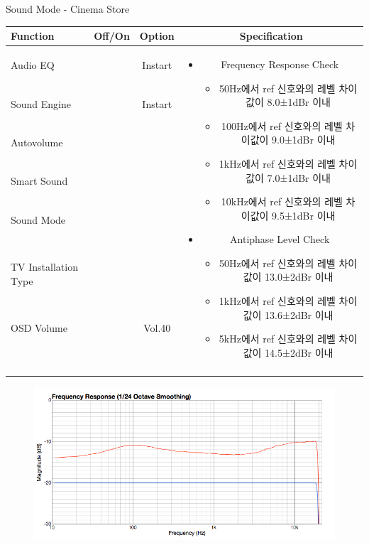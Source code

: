 \begin{frame}[t]{Sound Mode - Cinema Store}
\begin{tiny}
\begin{tabular}{@{}lccc@{}}
\toprule
Function & Off/On & Option & Specification \\
\midrule
Audio EQ & \color{black}{Off} & Instart &
\multirow{10}{60mm}{
\begin{itemize}
\item Frequency Response Check
	\begin{itemize}
	\item 50Hz에서 ref 신호와의 레벨 차이값이 8.0±1dBr 이내
	\item 100Hz에서 ref 신호와의 레벨 차이값이 9.0±1dBr 이내
	\item 1kHz에서 ref 신호와의 레벨 차이값이 7.0±1dBr 이내
	\item 10kHz에서 ref 신호와의 레벨 차이값이 9.5±1dBr 이내
	\end{itemize}
\item Antiphase Level Check
	\begin{itemize}
	\item 50Hz에서 ref 신호와의 레벨 차이값이 13.0±2dBr 이내
	\item 1kHz에서 ref 신호와의 레벨 차이값이 13.6±2dBr 이내
	\item 5kHz에서 ref 신호와의 레벨 차이값이 14.5±2dBr 이내
	\end{itemize}
\end{itemize}
} \\
Sound Engine & \color{blue}{On} & Instart & \\
Autovolume & \color{black}{Off} & & \\
Smart Sound & \color{black}{Off} & & \\
Sound Mode & \color{blue}{On} & \color{blue}{Cinema} & \\
TV Installation Type & \color{blue}{On} & \color{black}{Standtype1} & \\
OSD Volume & \color{blue}{On} & Vol.40 & \\
& & & \\
& & & \\
& & & \\
& & & \\
\midrule
\end{tabular}
\end{tiny}

\begin{figure}[b]
\includegraphics[height=0.4\textwidth]{figures/cinema.png}
\end{figure}

\end{frame}